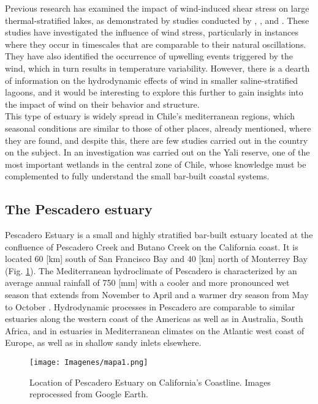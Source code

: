 \documentclass[tesis.tex]{subfiles}
\begin{document}
Previous research has examined the impact of wind-induced shear stress on large thermal-stratified lakes, as demonstrated by studies conducted by \cite{Coman2012}, \cite{Laval2008}, and \cite{avalos2019natural}. These studies have investigated the influence of wind stress, particularly in instances where they occur in timescales that are comparable to their natural oscillations. They have also identified the occurrence of upwelling events triggered by the wind, which in turn results in temperature variability. However, there is a dearth of information on the hydrodynamic effects of wind in smaller saline-stratified lagoons, and it would be interesting to explore this further to gain insights into the impact of wind on their behavior and structure.\\

This type of estuary is widely spread in Chile's mediterranean regions, which seasonal conditions are similar to those of other places, already mentioned, where they are found, and despite this, there are few studies carried out in the country on the subject. In \cite{dussaillant2009} an investigation was carried out on the Yali reserve, one of the most important wetlands in the central zone of Chile, whose knowledge must be complemented to fully understand the small bar-built coastal systems.\\

\subsection{The Pescadero estuary}

Pescadero Estuary is a small and highly stratified bar-built estuary located at the confluence of Pescadero Creek and Butano Creek on the California coast. It is located 60 [km] south of San Francisco Bay and 40 [km] north of Monterrey Bay (Fig. \ref{fig:locPDO}). The Mediterranean hydroclimate of Pescadero is characterized by an average annual rainfall of 750 [mm] with a cooler and more pronounced wet season that extends from November to April and a warmer dry season from May to October \citep{largier2015}. Hydrodynamic processes in Pescadero are comparable to similar estuaries along the western coast of the Americas as well as in Australia, South Africa, and in estuaries in Mediterranean climates on the Atlantic west coast of Europe, as well as in shallow sandy inlets elsewhere.\\

\begin{figure}[h!]
\centering
\texttt{[image: Imagenes/mapa1.png]}
\caption{Location of Pescadero Estuary on California's Coastline. Images reprocessed from Google Earth.}
\label{fig:locPDO}
\end{figure}
\end{document}
